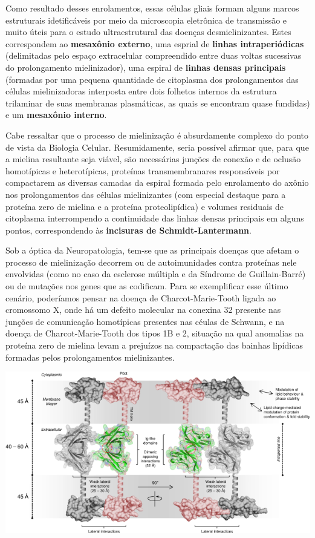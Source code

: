 \documentclass[
]{book}
\theoremstyle{definition}
\theoremstyle{definition}
\theoremstyle{definition}
\theoremstyle{definition}
\theoremstyle{remark}
\begin{document}
Como resultado desses enrolamentos, essas células gliais formam alguns marcos estruturais idetificáveis por meio da microscopia eletrônica de transmissão e muito úteis para o estudo ultraestrutural das doenças desmielinizantes. Estes correspondem ao \textbf{mesaxônio externo}, uma esprial de \textbf{linhas intraperiódicas} (delimitadas pelo espaço extracelular compreendido entre duas voltas sucessivas do prolongamento mielinizador), uma espiral de \textbf{linhas densas principais} (formadas por uma pequena quantidade de citoplasma dos prolongamentos das células mielinizadoras interposta entre dois folhetos internos da estrutura trilaminar de suas membranas plasmáticas, as quais se encontram quase fundidas) e um \textbf{mesaxônio interno}.

Cabe ressaltar que o processo de mielinização é absurdamente complexo do ponto de vista da Biologia Celular. Resumidamente, seria possível afirmar que, para que a mielina resultante seja viável, são necessárias junções de conexão e de oclusão homotípicas e heterotípicas, proteínas transmembranares responsáveis por compactarem as diversas camadas da espiral formada pelo enrolamento do axônio nos prolongamentos das células mielinizantes (com especial destaque para a proteína zero de mielina e a proteína proteolipídica) e volumes residuais de citoplasma interrompendo a continuidade das linhas densas principais em alguns pontos, correspondendo às \textbf{incisuras de Schmidt-Lantermann}.

Sob a óptica da Neuropatologia, tem-se que as principais doenças que afetam o processo de mielinização decorrem ou de autoimunidades contra proteínas nele envolvidas (como no caso da esclerose múltipla e da Síndrome de Guillain-Barré) ou de mutações nos genes que as codificam. Para se exemplificar esse último cenário, poderíamos pensar na doença de Charcot-Marie-Tooth ligada ao cromossomo X, onde há um defeito molecular na conexina 32 presente nas junções de comunicação homotípicas presentes nas céulas de Schwann, e na doença de Charcot-Marie-Tooth dos tipos 1B e 2, situação na qual anomalias na proteína zero de mielina levam a prejuízos na compactação das bainhas lipídicas formadas pelos prolongamentos mielinizantes.

\includegraphics{images/neuro-p0myelin.png}
\end{document}

